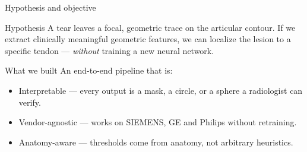 \begin{frame}{Hypothesis and objective}
  \begin{block}{Hypothesis}
    A tear leaves a \alert{focal, geometric trace} on the articular contour. If we extract clinically
    meaningful geometric features, we can \alert{localize} the lesion to a specific tendon ---
    \emph{without} training a new neural network.
  \end{block}

  \begin{block}{What we built}
    An end-to-end pipeline that is:
    \begin{itemize}
      \item \alert{Interpretable} --- every output is a mask, a circle, or a sphere a radiologist can verify.
      \item \alert{Vendor-agnostic} --- works on SIEMENS, GE and Philips without retraining.
      \item \alert{Anatomy-aware} --- thresholds come from anatomy, not arbitrary heuristics.
    \end{itemize}
  \end{block}
\end{frame}
